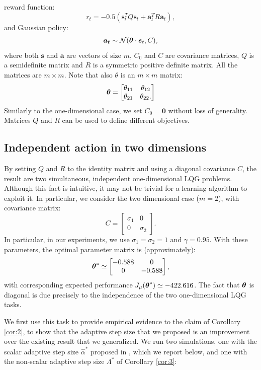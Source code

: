 reward function:
\[
	r_t=-0.5(\boldsymbol{s}_t^TQ\boldsymbol{s}_t + \boldsymbol{a}_t^TR\boldsymbol{a}_t),
\]
and Gaussian policy:
\[
	\boldsymbol{a_t} \sim \mathcal{N}(\boldsymbol{\theta} \cdot \boldsymbol{s}_t,C),
\]
where both $\boldsymbol{s}$ and $\boldsymbol{a}$ are vectors of size $m$, $C_0$ and $C$ are covariance matrices, $Q$ is a semidefinite matrix and $R$ is a symmetric positive definite matrix. All the matrices are $m\times m$. Note that also $\theta$ is an $m \times m$ matrix:
\[
\boldsymbol{\theta} = \begin{bmatrix}
\theta_{11} & \theta_{12} \\
\theta_{21} & \theta_{22}.
\end{bmatrix}
\]
Similarly to the one-dimensional case, we set $C_0=\boldsymbol{0}$ without loss of generality. Matrices $Q$ and $R$ can be used to define different objectives.

\subsection{Independent action in two dimensions}
By setting $Q$ and $R$ to the identity matrix and using a diagonal covariance $C$, the result are two simultaneous, independent one-dimensional \ac{LQG} problems. Although this fact is intuitive, it may not be trivial for a learning algorithm to exploit it. In particular, we consider the two dimensional case ($m=2$), with covariance matrix:
\[
	C = 
	\begin{bmatrix}
	\sigma_1 & 0 		\\
	0		 & \sigma_2
	\end{bmatrix}.
\]
In particular, in our experiments, we use $\sigma_1 = \sigma_2 = 1$ and $\gamma = 0.95$. With these parameters, the optimal parameter matrix is (approximately):
\[
	\boldsymbol{\theta}^* \simeq 
	\begin{bmatrix}
	-0.588 & 0 		\\
	0		 & -0.588
	\end{bmatrix},
\]
with corresponding expected performance $J_\mu(\boldsymbol{\theta}^*) \simeq -422.616$. The fact that $\boldsymbol{\theta}$ is diagonal is due precisely to the independence of the two one-dimensional \ac{LQG} tasks.

We first use this task to provide empirical evidence to the claim of Corollary \ref{cor:2}, \ie to show that the adaptive step size that we proposed is an improvement over the existing result that we generalized. We run two simulations, one with the scalar adaptive step size $\hat{\alpha}^*$ proposed in \cite{NIPS2013_5186}, which we report below, and one with the non-scalar adaptive step size $\Lambda^*$ of Corollary \ref{cor:3}:

